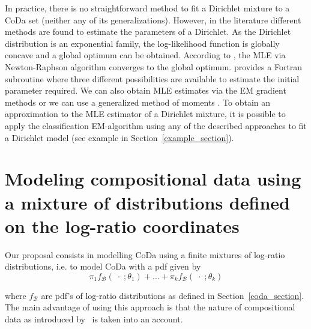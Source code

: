\documentclass[10pt, a4paper]{article}
\begin{document}
In practice, there is no straightforward method to fit a Dirichlet mixture to a CoDa set (neither any of its generalizations). However, in the literature different methods are found to estimate the parameters of a Dirichlet. As the Dirichlet distribution is an exponential family, the log-likelihood function is globally concave and a global optimum can be obtained. According to \cite{ng2011dirichlet}, the MLE via Newton-Raphson algorithm converges to the global optimum. \cite{narayanan1991algorithm} provides a Fortran subroutine where three different possibilities are available to estimate the initial parameter required.
We can also obtain MLE estimates via the EM gradient methods \citep{ng2011dirichlet} or we can use a generalized method of moments
\citep{hansen1982large}.  
To obtain an approximation to the MLE estimator of a Dirichlet mixture, it is possible to apply the classification EM-algorithm \citep[CEM algorithm,][]{celeux1992classification} using any of the described approaches to fit a Dirichlet model (see example in Section~\ref{example_section}).



\section{Modeling compositional data using a mixture of distributions defined on the log-ratio coordinates}
\label{codamix_section}

\noindent Our proposal consists in modelling CoDa using a finite mixtures of log-ratio distributions, i.e. to model CoDa with a pdf given by 
\begin{equation}
\pi_1 f_\mathcal{B}(\;\cdot\; ; \theta_1) + \dots + \pi_k f_\mathcal{B}(\;\cdot\; ; \theta_k)
\label{codamixt}
\end{equation}

where $f_\mathcal{B}$ are pdf's of log-ratio distributions as defined in Section~\ref{coda_section}. The main advantage of using this approach is that the nature of compositional data as introduced by~\cite{aitchison1986statistical} is taken into an account.
\end{document}
